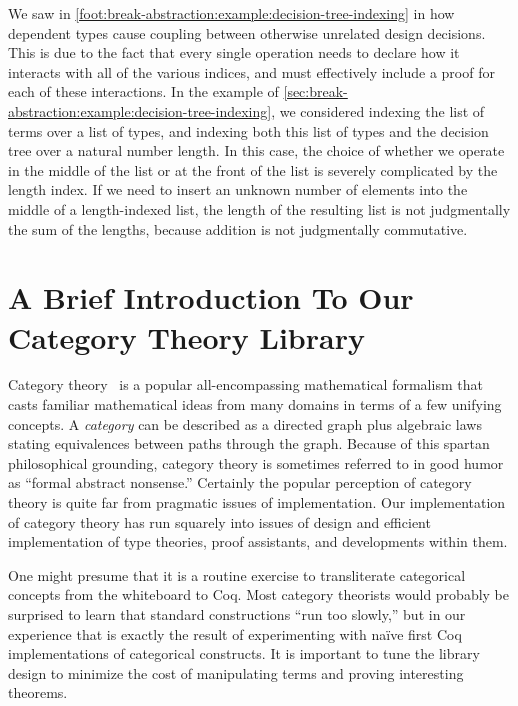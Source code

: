 We saw in \autoref{foot:break-abstraction:example:decision-tree-indexing} in  how dependent types cause coupling between otherwise unrelated design decisions.
This is due to the fact that every single operation needs to declare how it interacts with all of the various indices, and must effectively include a proof for each of these interactions.
In the example of \autoref{sec:break-abstraction:example:decision-tree-indexing}, we considered indexing the list of terms over a list of types, and indexing both this list of types and the decision tree over a natural number length.
In this case, the choice of whether we operate in the middle of the list or at the front of the list is severely complicated by the length index.
If we need to insert an unknown number of elements into the middle of a length-indexed list, the length of the resulting list is not judgmentally the sum of the lengths, because addition is not judgmentally commutative.

\section{A Brief Introduction To Our Category Theory Library}\label{sec:category-theory-library}
Category theory~\cite{mac1998categories} is a popular all-encompassing mathematical formalism that casts familiar mathematical ideas from many domains in terms of a few unifying concepts.
A \emph{category} can be described as a directed graph plus algebraic laws stating equivalences between paths through the graph.
Because of this spartan philosophical grounding, category theory is sometimes referred to in good humor as ``formal abstract nonsense.''
Certainly the popular perception of category theory is quite far from pragmatic issues of implementation.
Our implementation of category theory has run squarely into issues of design and efficient implementation of type theories, proof assistants, and developments within them.

One might presume that it is a routine exercise to transliterate categorical concepts from the whiteboard to Coq.
Most category theorists would probably be surprised to learn that standard constructions ``run too slowly,'' but in our experience that is exactly the result of experimenting with naïve first Coq implementations of categorical constructs.
It is important to tune the library design to minimize the cost of manipulating terms and proving interesting theorems.


